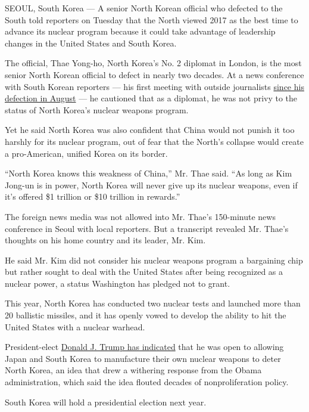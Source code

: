 SEOUL, South Korea --- A senior North Korean official who defected to
the South told reporters on Tuesday that the North viewed 2017 as the
best time to advance its nuclear program because it could take advantage
of leadership changes in the United States and South Korea.

The official, Thae Yong-ho, North Korea's No. 2 diplomat in London, is
the most senior North Korean official to defect in nearly two decades.
At a news conference with South Korean reporters --- his first meeting
with outside journalists
\href{https://www.nytimes3xbfgragh.onion/2016/08/18/world/asia/north-korea-defector-thae-yong-ho-britain.html}{since
his defection in August} --- he cautioned that as a diplomat, he was not
privy to the status of North Korea's nuclear weapons program.

Yet he said North Korea was also confident that China would not punish
it too harshly for its nuclear program, out of fear that the North's
collapse would create a pro-American, unified Korea on its border.

``North Korea knows this weakness of China,'' Mr. Thae said. ``As long
as Kim Jong-un is in power, North Korea will never give up its nuclear
weapons, even if it's offered \$1 trillion or \$10 trillion in
rewards.''

The foreign news media was not allowed into Mr. Thae's 150-minute news
conference in Seoul with local reporters. But a transcript revealed Mr.
Thae's thoughts on his home country and its leader, Mr. Kim.

He said Mr. Kim did not consider his nuclear weapons program a
bargaining chip but rather sought to deal with the United States after
being recognized as a nuclear power, a status Washington has pledged not
to grant.

This year, North Korea has conducted two nuclear tests and launched more
than 20 ballistic missiles, and it has openly vowed to develop the
ability to hit the United States with a nuclear warhead.

President-elect
\href{https://www.nytimes3xbfgragh.onion/2016/03/27/us/politics/donald-trump-foreign-policy.html}{Donald
J. Trump has indicated} that he was open to allowing Japan and South
Korea to manufacture their own nuclear weapons to deter North Korea, an
idea that drew a withering response from the Obama administration, which
said the idea flouted decades of nonproliferation policy.

South Korea will hold a presidential election next year.

